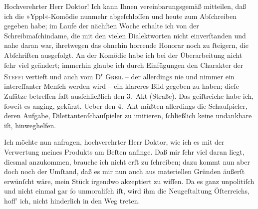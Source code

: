 \pstart\center{}Hochverehrter Herr Doktor!\pend\vspace{0.5em}
\pstart
           Ich kann Ihnen vereinbarungsgemäß mitteilen, daß ich die »Yppl«-Komödie nunmehr abgeſchloſſen und heute zum Abſchreiben
               gegeben habe; im Laufe der nächſten Woche erhalte ich von der Schreibmaſchindame, die
               mit den vielen Dialektworten nicht einverſtanden und nahe daran war, ihretwegen das
               ohnehin horrende Honorar noch zu{ }ſteigern, die Abſchriften ausgefolgt. An der Komödie
               habe ich bei der Überarbeitung nicht{ }ſehr viel geändert; immerhin glaube ich durch
               Einfügungen den Charakter der \textsc{Steffi} vertieft und auch vom D\textsuperscript{r}{ }\textsc{Greil} – der allerdings nie und nimmer ein intereſſanter Menſch werden wird – ein
               klareres {\pb}Bild gegeben zu haben; dieſe
               Zuſätze betreffen faſt ausſchließlich den 3. Akt (Straße). Das geiſtreiche \label{K_L02308-1v}\label{K_L02308-1} habe ich,{ }ſoweit es anging, gekürzt. Ueber den 4. Akt müßten allerdings die
               Schauſpieler, deren Aufgabe, Dilettantenſchauſpieler zu imitieren,{ }ſchließlich keine
               undankbare iſt, hinweghelfen.\pend
           
\pstart
           Ich möchte nun anfragen, hochverehrter Herr Doktor, wie ich es mit der Verwertung
               meines Produkts am Beſten anfinge. Daß mir{ }ſehr viel daran liegt, diesmal anzukommen,
               brauche ich nicht erſt zu{ }ſchreiben; dazu kommt nun aber doch noch der Umſtand, daß
               es mir nun auch aus materiellen Gründen äußerſt erwünſcht wäre, mein Stück irgendwo
               akzeptiert zu wiſſen. Da es ganz unpolitiſch und nicht einmal gar{ }ſo unmoraliſch iſt,
               wird ihm die Neugeſtaltung Öſterreichs, hoff’
               ich, nicht hinderlich in den Weg treten.\pend
           
